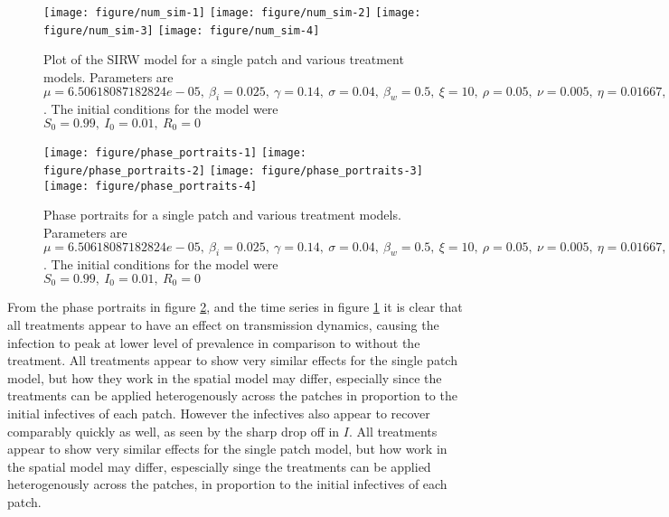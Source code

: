 \documentclass[12pt]{article}\usepackage[]{graphicx}\usepackage[]{color}
\newenvironment{knitrout}{}{} %
\begin{document}
\begin{knitrout}
\color{fgcolor}\begin{figure}

{\centering \texttt{[image: figure/num\_sim-1]} 
\texttt{[image: figure/num\_sim-2]} 
\texttt{[image: figure/num\_sim-3]} 
\texttt{[image: figure/num\_sim-4]} 

}

\caption{\label{fig:num.sim} Plot of the SIRW model for a single patch and various treatment models. Parameters are $\mu=6.50618087182824e-05,\ \beta_i=0.025,\ \gamma=0.14,\ \sigma=0.04,\ \beta_w=0.5,\ \xi=10,\ \rho=0.05,\ \nu=0.005,\ \eta=0.01667,\ \alpha=0$. The initial conditions for the model were $S_0=0.99,\ I_0=0.01,\ R_0=0$}\label{fig:num.sim}
\end{figure}


\end{knitrout}
\begin{knitrout}
\color{fgcolor}\begin{figure}

{\centering \texttt{[image: figure/phase\_portraits-1]} 
\texttt{[image: figure/phase\_portraits-2]} 
\texttt{[image: figure/phase\_portraits-3]} 
\texttt{[image: figure/phase\_portraits-4]} 

}

\caption{\label{fig:phase.portraits} Phase portraits for a single patch and various treatment models. Parameters are $\mu=6.50618087182824e-05,\ \beta_i=0.025,\ \gamma=0.14,\ \sigma=0.04,\ \beta_w=0.5,\ \xi=10,\ \rho=0.05,\ \nu=0.005,\ \eta=0.01667,\ \alpha=0$. The initial conditions for the model were $S_0=0.99,\ I_0=0.01,\ R_0=0$}\label{fig:phase.portraits}
\end{figure}


\end{knitrout}
\FloatBarrier
From the phase portraits in figure \ref{fig:phase.portraits}, and the time series in figure \ref{fig:num.sim} it is clear that all treatments appear to have an effect on transmission dynamics, causing the infection to peak at lower level of prevalence in comparison to without the treatment.
All treatments appear to show very similar effects for the single patch model, but how they work in the spatial model may differ, especially since the treatments can be applied heterogenously across the patches in proportion to the initial infectives of each patch.
However the infectives also appear to recover comparably quickly as well, as seen by the sharp drop off in $I$.
All treatments appear to show very similar effects for the single patch model, but how work in the spatial model may differ, espescially singe the treatments can be applied heterogenously across the patches, in proportion to the initial infectives of each patch.
\end{document}
